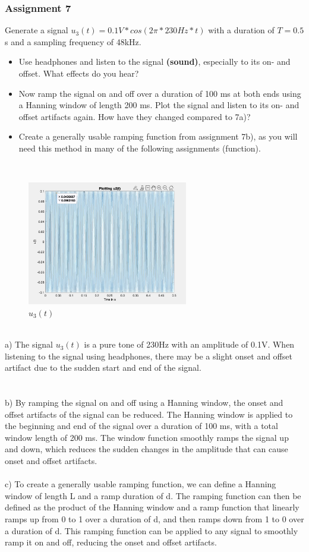 \documentclass[
	a4paper,
	11pt,
]{article}
\begin{document}
\subsubsection{Assignment 7}
Generate a signal \(u_3(t) = 0.1V*cos(2\pi*230Hz*t)\) with a duration of \(T =0.5\)s and a sampling frequency of 48kHz.\\
\begin{itemize}
\item Use headphones and listen to the signal \textbf{(sound)}, especially to its on- and offset. What effects do you hear?
\item Now ramp the signal on and off over a duration of 100 ms at both ends using a Hanning window of length 200 ms. Plot the signal and listen to its on- and offset artifacts again. How have they changed compared to 7a)?
\item Create a generally usable ramping function from assignment 7b), as you will need this method in many of the following assignments (function).
\end{itemize}
\\
\begin{figure}[htb!]
    \centerline{\includegraphics[width=7cm]{A67/a7.jpg}}
    \caption{\(u_3(t)\)}
\end{figure}



\\

a) The signal \(u_3(t)\) is a pure tone of 230Hz with an amplitude of 0.1V. When listening to the signal using headphones, there may be a slight onset and offset artifact due to the sudden start and end of the signal.\\
\\
\\
b) By ramping the signal on and off using a Hanning window, the onset and offset artifacts of the signal can be reduced. The Hanning window is applied to the beginning and end of the signal over a duration of 100 ms, with a total window length of 200 ms. The window function smoothly ramps the signal up and down, which reduces the sudden changes in the amplitude that can cause onset and offset artifacts.\\
\\
c) To create a generally usable ramping function, we can define a Hanning window of length L and a ramp duration of d. The ramping function can then be defined as the product of the Hanning window and a ramp function that linearly ramps up from 0 to 1 over a duration of d, and then ramps down from 1 to 0 over a duration of d. This ramping function can be applied to any signal to smoothly ramp it on and off, reducing the onset and offset artifacts.
\end{document}
